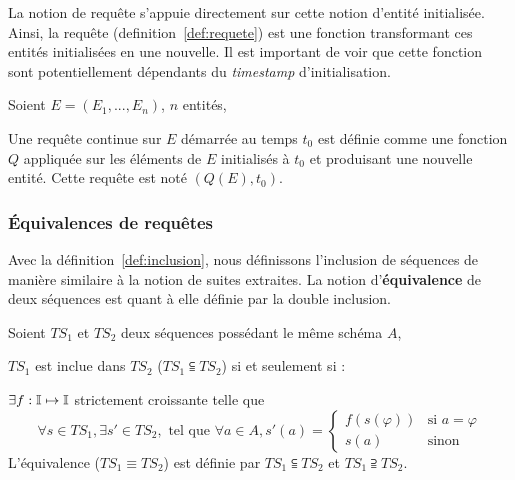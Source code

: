 La notion de requête s'appuie directement sur cette notion d'entité initialisée. Ainsi, la requête (definition~\ref{def:requete}) est une fonction transformant ces entités initialisées en une nouvelle. Il est important de voir que cette fonction sont potentiellement dépendants du \textit{timestamp} d'initialisation.
\begin{defi}[Requête]\label{def:requete}
	Soient $E=(E_1, ..., E_n)$, $n$ entités,
	
	Une requête continue sur $E$ démarrée au temps $t_0$ est définie comme une fonction $Q$ appliquée sur les éléments de $E$ initialisés à $t_0$ et produisant une nouvelle entité. Cette requête est noté $(Q(E),t_0)$.
\end{defi}

\subsubsection{Équivalences de requêtes}
Avec la définition~\ref{def:inclusion}, nous définissons l'inclusion de séquences de manière similaire à la notion de suites extraites. La notion d'\textbf{équivalence} de deux séquences est quant à elle définie par la double inclusion. 
\begin{defi}\label{def:inclusion}
	Soient $TS_1$ et $TS_2$ deux séquences possédant le même schéma $A$,
	
	$TS_1$ est inclue dans $TS_2$ ($TS_1 \subseteqq TS_2$) si et seulement si : 
	
	\quad \quad $\exists f:\mathbb{I} \mapsto \mathbb{I}$ strictement croissante telle que 
$$\forall s\in TS_1, \exists s'\in TS_2, \textrm{ tel que } \forall a \in A, s'(a) = \begin{cases} f(s(\varphi)) & \textrm{si } a = \varphi \\ s(a) & \textrm{sinon}\end{cases}$$
	L'équivalence ($TS_1 \equiv TS_2$) est définie par $TS_1 \subseteqq TS_2$ et $TS_1 \supseteqq TS_2$. 
\end{defi}%


